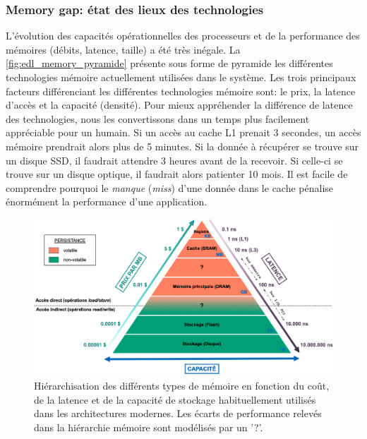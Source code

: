     \subsubsection{Memory gap: état des lieux des technologies}
    
        L'évolution des capacités opérationnelles des processeurs et de la performance des mémoires (débits, latence, taille) a été très inégale. La \autoref{fig:edl_memory_pyramide} présente sous forme de pyramide les différentes technologies mémoire actuellement utilisées dans le système. Les trois principaux facteurs différenciant les différentes technologies mémoire sont: le prix, la latence d'accès et la capacité (densité). Pour mieux appréhender la différence de latence des technologies, nous les convertissons dans un temps plus facilement appréciable pour un humain. Si un accès au cache L1 prenait 3 secondes, un accès mémoire prendrait alors plus de 5 minutes. Si la donnée à récupérer se trouve sur un disque SSD, il faudrait attendre 3 heures avant de la recevoir. Si celle-ci se trouve sur un disque optique, il faudrait alors patienter 10 mois. Il est facile de comprendre pourquoi le \textit{manque} (\textit{miss}) d'une donnée dans le cache pénalise énormément la performance d'une application. 
        
        \begin{figure}
            \center
            \includegraphics[width=17cm]{images/edl_memory_pyramide.png}
            \caption{\label{fig:edl_memory_pyramide} Hiérarchisation des différents types de mémoire en fonction du coût, de la latence et de la capacité de stockage habituellement utilisés dans les architectures modernes. Les écarts de performance relevés dans la hiérarchie mémoire sont modélisés par un '?'.}
        \end{figure}
        
